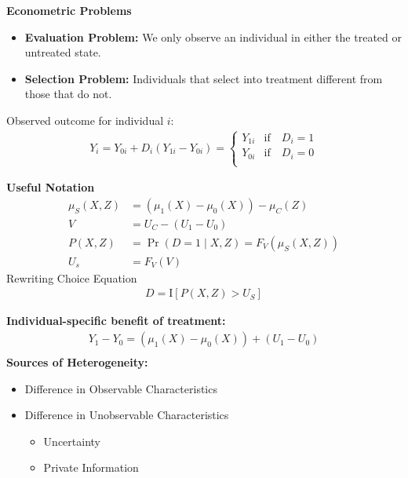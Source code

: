 \begin{frame}
\textbf{Econometric Problems}
\begin{itemize}
\item \textbf{Evaluation Problem:} We only observe an individual in either the treated or untreated state.
\item \textbf{Selection Problem:} Individuals that select into treatment different from those that do not.
\end{itemize}
\end{frame}


\begin{frame}
Observed outcome for individual \(i\):
\begin{align*}
Y_i = Y_{0i} + D_i (Y_{1i} - Y_{0i}) = 
\begin{cases}
Y_{1i} & \text{if}\quad D_i = 1 \\
Y_{0i} & \text{if}\quad D_i = 0 \\
\end{cases}
\end{align*}
\end{frame}


\begin{frame}
\textbf{Useful Notation}
\begin{align*}
\mu_S(X, Z) & = (\mu_1(X) - \mu_0(X)) - \mu_C(Z) \\
V & = U_C - (U_1 - U_0) \\
P(X, Z) & = \Pr(D = 1 \mid X, Z)  = F_V(\mu_S(X, Z)) \\
U_s & = F_V(V) 
\end{align*}
Rewriting Choice Equation
\begin{align*}
D = \mathrm{I}[P(X,Z) > U_S]
\end{align*}
\end{frame}


\begin{frame}
\textbf{Individual-specific benefit of treatment:}
\begin{align*}
Y_1 - Y_0 = (\mu_1(X) - \mu_0(X)) + (U_1 - U_0)\\
\end{align*}
\textbf{Sources of Heterogeneity:}
\begin{itemize}
	\item Difference in Observable Characteristics
	\item Difference in Unobservable Characteristics
	\begin{itemize}
		\item  Uncertainty 
		\item Private Information
	\end{itemize}
\end{itemize}
\end{frame}


